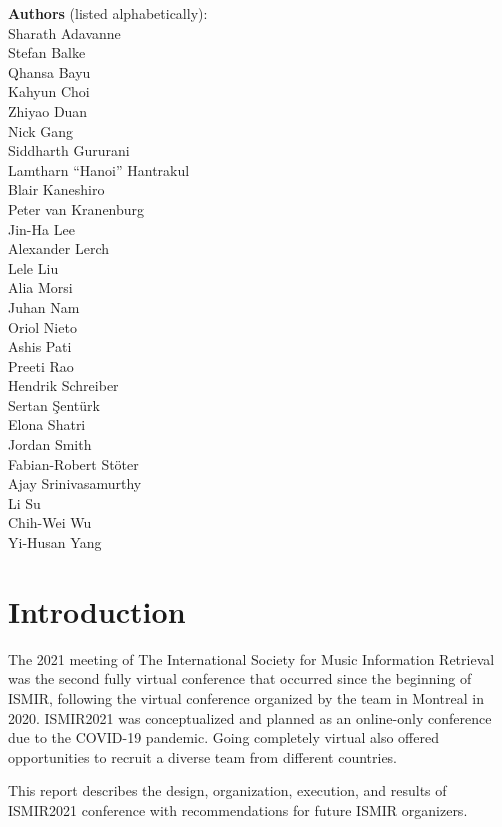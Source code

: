 \documentclass[%
10pt,								%
titlepage,						%
]
{scrartcl}
\begin{document}
\begin{titlepage}
    \vfill
    \textbf{Authors} (listed alphabetically):\\
    Sharath Adavanne\\
    Stefan Balke\\
    Qhansa Bayu\\
    Kahyun Choi\\
    Zhiyao Duan\\
    Nick Gang\\
    Siddharth Gururani\\
    Lamtharn ``Hanoi'' Hantrakul\\
    Blair Kaneshiro\\
    Peter van Kranenburg\\
    Jin-Ha Lee\\
    Alexander Lerch\\
    Lele Liu\\
    Alia Morsi\\
    Juhan Nam\\
    Oriol Nieto\\
    Ashis Pati\\
    Preeti Rao\\
    Hendrik Schreiber\\
    Sertan \c{S}ent\"urk\\
    Elona Shatri\\
    Jordan Smith\\
    Fabian-Robert Stöter\\
    Ajay Srinivasamurthy\\
    Li Su\\
    Chih-Wei Wu\\
    Yi-Husan Yang
\end{titlepage}

\tableofcontents		
\clearpage

\pagestyle{fancy}
\section{Introduction}
    The 2021 meeting of The International Society for Music Information Retrieval was the second fully virtual conference that occurred since the beginning of ISMIR, following the virtual conference organized by the team in Montreal in 2020. ISMIR2021 was conceptualized and planned as an online-only conference due to the COVID-19 pandemic. Going completely virtual also offered opportunities to recruit a diverse team from different countries. 

    This report describes the design, organization, execution, and results of ISMIR2021 conference with recommendations for future ISMIR organizers.  
\end{document}
